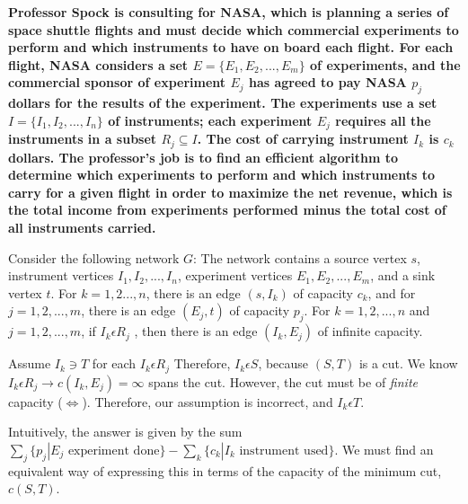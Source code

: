 \documentclass[10pt,fullpage]{article}
\begin{document}
{\bf Professor Spock is consulting for NASA, which is planning a
series of space shuttle flights and must decide which commercial
experiments to perform and which instruments to have on board each
flight. For each flight, NASA considers a set $E = \{E_1, E_2, . . .
,E_m\}$ of experiments, and the commercial sponsor of experiment
$E_j$ has agreed to pay NASA $p_j$ dollars for the results of the
experiment. The experiments use a set $I = \{I_1, I_2, . . . ,I_n\}$
of instruments; each experiment $E_j$ requires all the instruments
in a subset $R_j \subseteq I$. The cost of carrying instrument $I_k$
is $c_k$ dollars. The professor's job is to find an efficient
algorithm to determine which experiments to perform and which
instruments to carry for a given flight in order to maximize the net
revenue, which is the total income from experiments performed minus
the total cost of all instruments carried.

Consider the following network $G$: The network contains a source
vertex $s$, instrument vertices $I_1, I_2, . . . ,I_n$, experiment
vertices $E_1, E_2, . . . ,E_m$, and a sink vertex $t$. For $k = 1,
2. . . ,n$, there is an edge $(s, I_k)$ of capacity $c_k$, and for
$j = 1, 2,. . . ,m$, there is an edge $(E_j, t)$ of capacity $p_j$.
For $k = 1, 2, . . . ,n$ and $j = 1, 2, . . . ,m$, if $I_k \epsilon
R_j$ , then there is an edge $(I_k, E_j)$ of infinite capacity.}



\noindent Assume $I_k \ni T$ for each $I_k \epsilon R_j$ Therefore,
$I_k \epsilon S$, because $(S,T)$ is a cut. We know $I_k \epsilon
R_j \rightarrow c(I_k, E_j) = \infty$ spans the cut. However, the
cut must be of {\em finite} capacity ($\Leftrightarrow$). Therefore,
our assumption is incorrect, and $I_k \epsilon T$.


Intuitively, the answer is given by the sum $\sum_{j}\{p_j | E_j
\text{ experiment done}\} - \sum_{k}\{c_k | I_k \text{ instrument
used}\}$. We must find an equivalent way of expressing this in terms
of the capacity of the minimum cut, $c(S,T)$.
\end{document}
